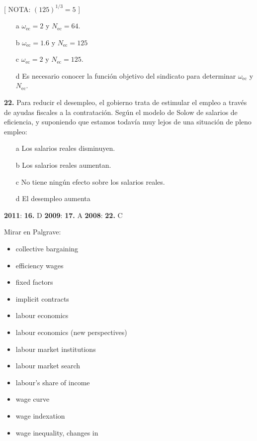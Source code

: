 \documentclass{nuevotema}
\begin{document}
[ NOTA: $(125)^{1/3} = 5$ ]

\begin{itemize}
	\item[a] $\omega_\text{ec} = 2$ y $N_\text{ec} = 64$.
	\item[b] $\omega_\text{ec} = 1.6$ y $N_\text{ec} = 125$
	\item[c] $\omega_\text{ec} = 2$ y $N_\text{ec} = 125$.
	\item[d] Es necesario conocer la función objetivo del sindicato para determinar $\omega_\text{ec}$ y $N_\text{ec}$.
\end{itemize}

\textbf{22.} Para reducir el desempleo, el gobierno trata de estimular el empleo a través de ayudas fiscales a la contratación. Según el modelo de Solow de salarios de eficiencia, y suponiendo que estamos todavía muy lejos de una situación de pleno empleo:

\begin{itemize}
	\item[a] Los salarios reales disminuyen.
	\item[b] Los salarios reales aumentan.
	\item[c] No tiene ningún efecto sobre los salarios reales.
	\item[d] El desempleo aumenta
\end{itemize}

\notas

\textbf{2011}: \textbf{16.} D
\textbf{2009}: \textbf{17.} A
\textbf{2008}: \textbf{22.} C

\bibliografia

Mirar en Palgrave:
\begin{itemize}
	\item collective bargaining
	\item efficiency wages
	\item fixed factors
	\item implicit contracts
	\item labour economics
	\item labour economics (new perspectives)
	\item labour market institutions
	\item labour market search
	\item labour's share of income
	\item wage curve
	\item wage indexation
	\item wage inequality, changes in
\end{itemize}
\end{document}
